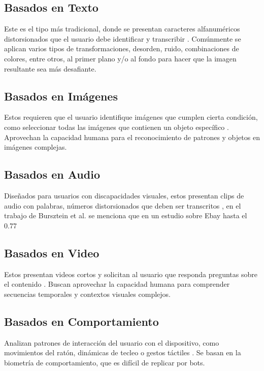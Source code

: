 \documentclass[conference]{IEEEtran}
\begin{document}
\subsection{Basados en Texto}

Este es el tipo más tradicional, donde se presentan caracteres alfanuméricos distorsionados que el usuario debe identificar y transcribir \cite{VonAhn2003}. Comúnmente se aplican varios tipos de transformaciones, desorden, ruido, combinaciones de colores, entre otros, al primer plano y/o al fondo para hacer que la imagen resultante sea más desafiante. \cite{Algwil2023}

\subsection{Basados en Imágenes}

Estos requieren que el usuario identifique imágenes que cumplen cierta condición, como seleccionar todas las imágenes que contienen un objeto específico \cite{Gossweiler2009}. Aprovechan la capacidad humana para el reconocimiento de patrones y objetos en imágenes complejas.

\subsection{Basados en Audio}

Diseñados para usuarios con discapacidades visuales, estos presentan clips de audio con palabras, números distorsionados que deben ser transcritos \cite{Tam2008}, en el trabajo de Bursztein et al. \cite{Bursztein2011} se menciona que en un estudio sobre Ebay hasta el 0.77%

\subsection{Basados en Video}

Estos presentan videos cortos y solicitan al usuario que responda preguntas sobre el contenido \cite{Kluever2009}. Buscan aprovechar la capacidad humana para comprender secuencias temporales y contextos visuales complejos.

\subsection{Basados en Comportamiento}

Analizan patrones de interacción del usuario con el dispositivo, como movimientos del ratón, dinámicas de tecleo o gestos táctiles \cite{Murdoch2020}. Se basan en la biometría de comportamiento, que es difícil de replicar por bots.
\end{document}
